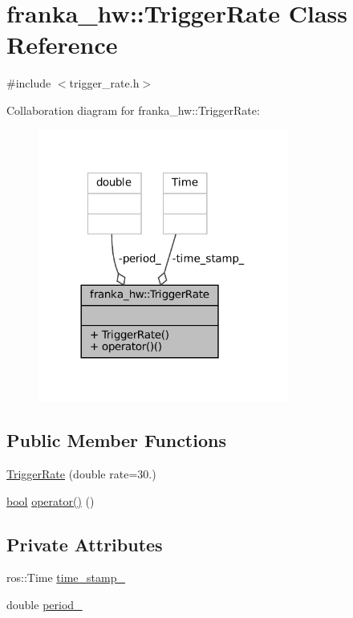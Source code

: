 \hypertarget{classfranka__hw_1_1TriggerRate}{}\section{franka\+\_\+hw\+:\+:Trigger\+Rate Class Reference}
\label{classfranka__hw_1_1TriggerRate}


{\ttfamily \#include $<$trigger\+\_\+rate.\+h$>$}



Collaboration diagram for franka\+\_\+hw\+:\+:Trigger\+Rate\+:
\nopagebreak
\begin{figure}[H]
\begin{center}
\leavevmode
\includegraphics[width=233pt]{classfranka__hw_1_1TriggerRate__coll__graph}
\end{center}
\end{figure}
\subsection*{Public Member Functions}
\begin{DoxyCompactItemize}
\item 
\hyperlink{classfranka__hw_1_1TriggerRate_a68cde52c634b5bcb56f9276050a52e0d}{Trigger\+Rate} (double rate=30.)
\item 
\hyperlink{classbool}{bool} \hyperlink{classfranka__hw_1_1TriggerRate_a808b03abfa76f0226ebac665ad8d3ce7}{operator()} ()
\end{DoxyCompactItemize}
\subsection*{Private Attributes}
\begin{DoxyCompactItemize}
\item 
ros\+::\+Time \hyperlink{classfranka__hw_1_1TriggerRate_a6cbf0023238a654a03405b33ef8272b5}{time\+\_\+stamp\+\_\+}
\item 
double \hyperlink{classfranka__hw_1_1TriggerRate_a447516b7353ac0f006eac0ad6c76a0d1}{period\+\_\+}
\end{DoxyCompactItemize}


